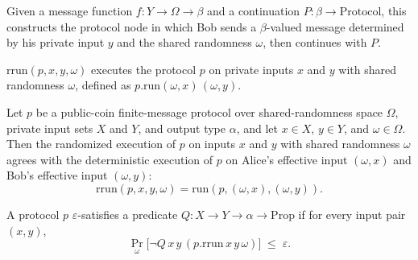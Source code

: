 \begin{definition}
\label{CommunicationComplexity.PublicCoin.FiniteMessage.Protocol.bob}
\leanok
{}
Given a message function $f : Y \to \Omega \to \beta$ and a continuation
$P : \beta \to \mathrm{Protocol}$, this constructs the protocol node in which Bob sends
a $\beta$-valued message determined by his private input $y$ and the shared randomness
$\omega$, then continues with $P$.
\end{definition}

\begin{definition}
\label{CommunicationComplexity.PublicCoin.FiniteMessage.Protocol.rrun}
\leanok
{}
$\mathrm{rrun}(p, x, y, \omega)$ executes the protocol $p$ on private inputs $x$ and $y$
with shared randomness $\omega$, defined as $p.\mathrm{run}(\omega, x)\,(\omega, y)$.
\end{definition}

\begin{theorem}
\label{CommunicationComplexity.PublicCoin.FiniteMessage.Protocol.rrun_eq}
\leanok
{}
Let $p$ be a public-coin finite-message protocol over shared-randomness space $\Omega$,
private input sets $X$ and $Y$, and output type $\alpha$, and let $x \in X$, $y \in Y$,
and $\omega \in \Omega$. Then the randomized execution of $p$ on inputs $x$ and $y$ with
shared randomness $\omega$ agrees with the deterministic execution of $p$ on Alice's
effective input $(\omega, x)$ and Bob's effective input $(\omega, y)$: \[
\mathrm{rrun}(p, x, y, \omega) = \mathrm{run}(p, (\omega, x), (\omega, y)). \]
\end{theorem}

\begin{definition}
\label{CommunicationComplexity.PublicCoin.FiniteMessage.Protocol.ApproxSatisfies}
\leanok
{}
A protocol $p$ $\varepsilon$-satisfies a predicate $Q : X \to Y \to \alpha \to \mathrm{Prop}$
if for every input pair $(x, y)$,
\[
  \Pr_{\omega}\bigl[\neg Q\,x\,y\,(p.\mathrm{rrun}\,x\,y\,\omega)\bigr] \;\le\; \varepsilon.
\]
\end{definition}

